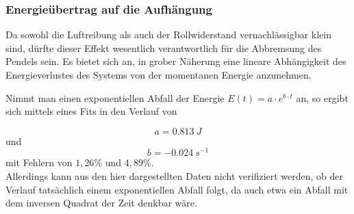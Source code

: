 \subsubsection{Energieübertrag auf die Aufhängung}
Da sowohl die Luftreibung als auch der Rollwiderstand vernachlässigbar klein sind, dürfte dieser Effekt wesentlich verantwortlich für die Abbremsung des Pendels sein. 
Es bietet sich an, in grober Näherung eine lineare Abhängigkeit des Energieverlustes des Systems von der momentanen Energie anzunehmen. 

Nimmt man einen exponentiellen Abfall der Energie $ E(t) = a \cdot e^{b \cdot t} $ an, so ergibt sich mittels eines Fits in den Verlauf von 

$$ a = 0.813 \  J $$ und $$ b = -0.024 \  s^{-1} $$ mit Fehlern von $1,26 \% $ und $ 4,89 \% $. \\
Allerdings kann aus den hier dargestellten Daten nicht verifiziert werden, ob der Verlauf tatsächlich einem exponentiellen Abfall folgt, da auch etwa ein Abfall mit dem inversen Quadrat der Zeit denkbar wäre. 

